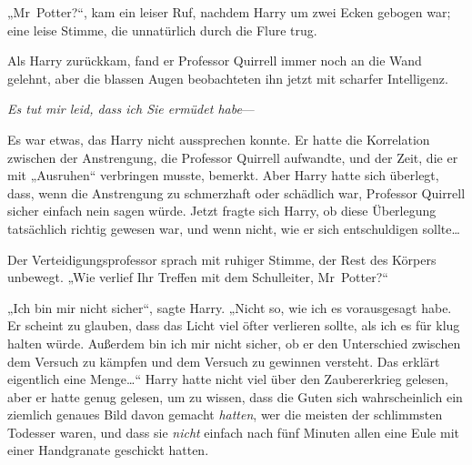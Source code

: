 „Mr~Potter?“, kam ein leiser Ruf, nachdem Harry um zwei Ecken gebogen war; eine leise Stimme, die unnatürlich durch die Flure trug.

Als Harry zurückkam, fand er Professor Quirrell immer noch an die Wand gelehnt, aber die blassen Augen beobachteten ihn jetzt mit scharfer Intelligenz.

\emph{Es tut mir leid, dass ich Sie ermüdet habe}—

Es war etwas, das Harry nicht aussprechen konnte. Er hatte die Korrelation zwischen der Anstrengung, die Professor Quirrell aufwandte, und der Zeit, die er mit „Ausruhen“ verbringen musste, bemerkt. Aber Harry hatte sich überlegt, dass, wenn die Anstrengung zu schmerzhaft oder schädlich war, Professor Quirrell sicher einfach nein sagen würde. Jetzt fragte sich Harry, ob diese Überlegung tatsächlich richtig gewesen war, und wenn nicht, wie er sich entschuldigen sollte…

Der Verteidigungsprofessor sprach mit ruhiger Stimme, der Rest des Körpers unbewegt. „Wie verlief Ihr Treffen mit dem Schulleiter, Mr~Potter?“

„Ich bin mir nicht sicher“, sagte Harry. „Nicht so, wie ich es vorausgesagt habe. Er scheint zu glauben, dass das Licht viel öfter verlieren sollte, als ich es für klug halten würde. Außerdem bin ich mir nicht sicher, ob er den Unterschied zwischen dem Versuch zu kämpfen und dem Versuch zu gewinnen versteht. Das erklärt eigentlich eine Menge…“ Harry hatte nicht viel über den Zaubererkrieg gelesen, aber er hatte genug gelesen, um zu wissen, dass die Guten sich wahrscheinlich ein ziemlich genaues Bild davon gemacht \emph{hatten}, wer die meisten der schlimmsten Todesser waren, und dass sie \emph{nicht} einfach nach fünf Minuten allen eine Eule mit einer Handgranate geschickt hatten.

